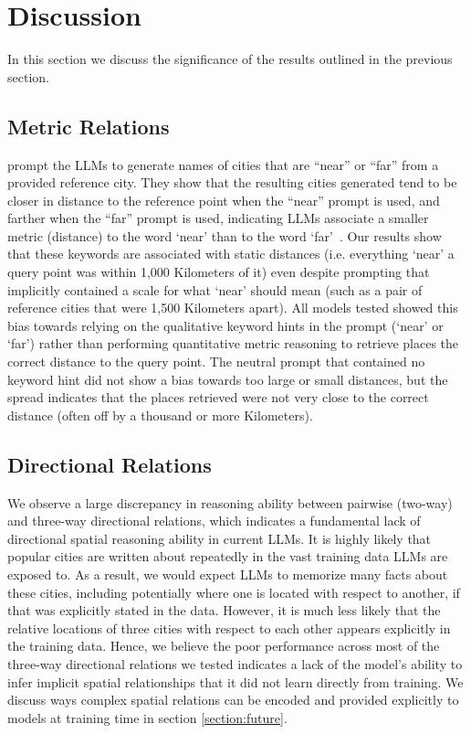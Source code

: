 \section{Discussion}
\label{section:discussion}


In this section we discuss the significance of the results outlined in the previous section.

\subsection{Metric Relations}

\citeauthor{Bhandari2023} prompt the LLMs to generate names of cities that are ``near'' or ``far'' from a provided reference city.
They show that the resulting cities generated tend to be closer in distance to the reference point when the ``near'' prompt is used, and farther when the ``far'' prompt is used, indicating LLMs associate a smaller metric (distance) to the word `near' than to the word `far'~\cite{Bhandari2023}.
Our results show that these keywords are associated with static distances (i.e. everything `near' a query point was within 1,000 Kilometers of it) even despite prompting that implicitly contained a scale for what `near' should mean (such as a pair of reference cities that were 1,500 Kilometers apart).
All models tested showed this bias towards relying on the qualitative keyword hints in the prompt (`near' or `far') rather than performing quantitative metric reasoning to retrieve places the correct distance to the query point.
The neutral prompt that contained no keyword hint did not show a bias towards too large or small distances, but the spread indicates that the places retrieved were not very close to the correct distance (often off by a thousand or more Kilometers).


\subsection{Directional Relations}
We observe a large discrepancy in reasoning ability between pairwise (two-way) and three-way directional relations, which indicates a fundamental lack of directional spatial reasoning ability in current LLMs.
It is highly likely that popular cities are written about repeatedly in the vast training data LLMs are exposed to.
As a result, we would expect LLMs to memorize many facts about these cities, including potentially where one is located with respect to another, if that was explicitly stated in the data.
However, it is much less likely that the relative locations of three cities with respect to each other appears explicitly in the training data.
Hence, we believe the poor performance across most of the three-way directional relations we tested indicates a lack of the model's ability to infer implicit spatial relationships that it did not learn directly from training.
We discuss ways complex spatial relations can be encoded and provided explicitly to models at training time in section \ref{section:future}.


